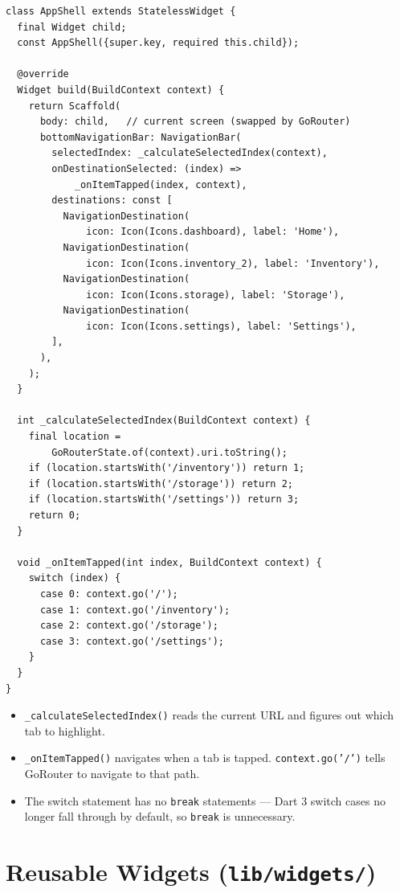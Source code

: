 \documentclass[11pt, a4paper]{article}
\begin{document}
\begin{lstlisting}
class AppShell extends StatelessWidget {
  final Widget child;
  const AppShell({super.key, required this.child});

  @override
  Widget build(BuildContext context) {
    return Scaffold(
      body: child,   // current screen (swapped by GoRouter)
      bottomNavigationBar: NavigationBar(
        selectedIndex: _calculateSelectedIndex(context),
        onDestinationSelected: (index) =>
            _onItemTapped(index, context),
        destinations: const [
          NavigationDestination(
              icon: Icon(Icons.dashboard), label: 'Home'),
          NavigationDestination(
              icon: Icon(Icons.inventory_2), label: 'Inventory'),
          NavigationDestination(
              icon: Icon(Icons.storage), label: 'Storage'),
          NavigationDestination(
              icon: Icon(Icons.settings), label: 'Settings'),
        ],
      ),
    );
  }

  int _calculateSelectedIndex(BuildContext context) {
    final location =
        GoRouterState.of(context).uri.toString();
    if (location.startsWith('/inventory')) return 1;
    if (location.startsWith('/storage')) return 2;
    if (location.startsWith('/settings')) return 3;
    return 0;
  }

  void _onItemTapped(int index, BuildContext context) {
    switch (index) {
      case 0: context.go('/');
      case 1: context.go('/inventory');
      case 2: context.go('/storage');
      case 3: context.go('/settings');
    }
  }
}
\end{lstlisting}

\begin{itemize}
    \item \texttt{\_calculateSelectedIndex()} reads the current URL and figures out which tab to highlight.
    \item \texttt{\_onItemTapped()} navigates when a tab is tapped. \texttt{context.go('/')} tells GoRouter to navigate to that path.
    \item The switch statement has no \texttt{break} statements --- Dart 3 switch cases no longer fall through by default, so \texttt{break} is unnecessary.
\end{itemize}

\newpage

\section{Reusable Widgets (\texttt{lib/widgets/})}
\end{document}
